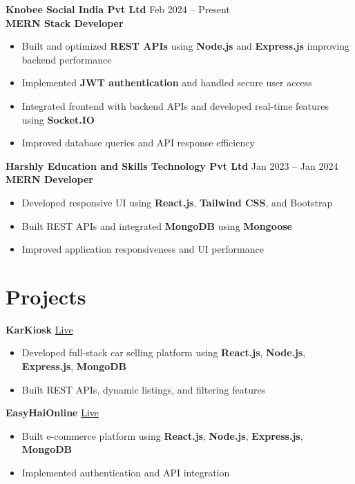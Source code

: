 \documentclass[letterpaper,11pt]{article}
\begin{document}
\textbf{Knobee Social India Pvt Ltd} \hfill Feb 2024 -- Present \\
\textbf{MERN Stack Developer}
\begin{itemize}
\item Built and optimized \textbf{REST APIs} using \textbf{Node.js} and \textbf{Express.js} improving backend performance
\item Implemented \textbf{JWT authentication} and handled secure user access
\item Integrated frontend with backend APIs and developed real-time features using \textbf{Socket.IO}
\item Improved database queries and API response efficiency
\end{itemize}

\textbf{Harshly Education and Skills Technology Pvt Ltd} \hfill Jan 2023 -- Jan 2024 \\
\textbf{MERN Developer}
\begin{itemize}
\item Developed responsive UI using \textbf{React.js}, \textbf{Tailwind CSS}, and Bootstrap
\item Built REST APIs and integrated \textbf{MongoDB} using \textbf{Mongoose}
\item Improved application responsiveness and UI performance
\end{itemize}

\section{Projects}

\textbf{KarKiosk} \hfill \href{https://karkiosk.com/}{Live}
\begin{itemize}
\item Developed full-stack car selling platform using \textbf{React.js}, \textbf{Node.js}, \textbf{Express.js}, \textbf{MongoDB}
\item Built REST APIs, dynamic listings, and filtering features
\end{itemize}

\textbf{EasyHaiOnline} \hfill \href{https://easyhaionline.com/}{Live}
\begin{itemize}
\item Built e-commerce platform using \textbf{React.js}, \textbf{Node.js}, \textbf{Express.js}, \textbf{MongoDB}
\item Implemented authentication and API integration
\end{itemize}
\end{document}
